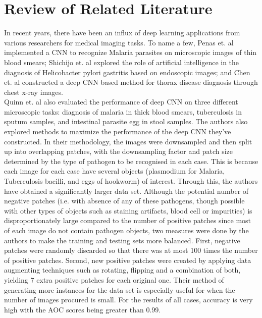 \section{Review of Related Literature}

\qquad In recent years, there have been an influx of deep learning applications from various researchers for medical imaging tasks. To name a few, Penas et. al \cite{malariablood} implemented a CNN to recognize Malaria parasites on microscopic images of thin blood smears; Shichijo et. al \cite{helicobacter} explored the role of artificial intelligence in the diagnosis of Helicobacter pylori gastritis based on endoscopic images; and Chen et. al \cite{thorax} constructed a deep CNN based method for thorax disease diagnosis through chest x-ray images. \\

	Quinn et. al \cite{quinn} also evaluated the performance of deep CNN on three different microscopic tasks: diagnosis of malaria in thick blood smears, tuberculosis in sputum samples, and intestinal parasite egg in stool samples. The authors also explored methods to maximize the performance of the deep CNN they've constructed. In their methodology, the images were downsampled and then split up into overlapping patches, with the downsampling factor and patch size determined by the type of pathogen to be recognised in each case. This is because each image for each case have several objects (plasmodium for Malaria, Tuberculosis bacilli, and eggs of hookworm) of interest. Through this, the authors have obtained a significantly larger data set. Although the potential number of negative patches (i.e. with absence of any of these pathogens, though possible with other types of objects such as staining artifacts, blood cell or impurities) is disproportionately large compared to the number of positive patches since most of each image do not contain pathogen objects, two measures were done by the authors to make the training and testing sets more balanced. First, negative patches were randomly discarded so that there was at most 100 times the number of positive patches. Second, new positive patches were created by applying data augmenting techniques such as rotating, flipping and a combination of both, yielding 7 extra positive patches for each original one. Their method of generating more instances for the data set is especially useful for when the number of images procured is small. For the results of all cases, accuracy is very high with the AOC scores being greater than 0.99. \\

